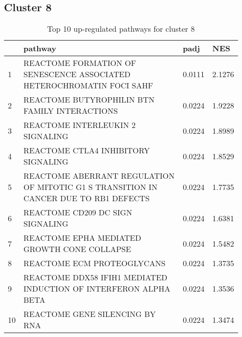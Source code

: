 \documentclass{article}
\begin{document}
\subsection{Cluster 8 }
\begin{table}[H]
\centering
\begin{tabular}{p{0.05\linewidth}p{0.7\linewidth}p{0.1\linewidth}p{0.1\linewidth}}
  \hline
 & pathway & padj & NES \\ 
  \hline
1 & REACTOME FORMATION OF SENESCENCE ASSOCIATED HETEROCHROMATIN FOCI SAHF & 0.0111 & 2.1276 \\ 
  2 & REACTOME BUTYROPHILIN BTN FAMILY INTERACTIONS & 0.0224 & 1.9228 \\ 
  3 & REACTOME INTERLEUKIN 2 SIGNALING & 0.0224 & 1.8989 \\ 
  4 & REACTOME CTLA4 INHIBITORY SIGNALING & 0.0224 & 1.8529 \\ 
  5 & REACTOME ABERRANT REGULATION OF MITOTIC G1 S TRANSITION IN CANCER DUE TO RB1 DEFECTS & 0.0224 & 1.7735 \\ 
  6 & REACTOME CD209 DC SIGN SIGNALING & 0.0224 & 1.6381 \\ 
  7 & REACTOME EPHA MEDIATED GROWTH CONE COLLAPSE & 0.0224 & 1.5482 \\ 
  8 & REACTOME ECM PROTEOGLYCANS & 0.0224 & 1.3735 \\ 
  9 & REACTOME DDX58 IFIH1 MEDIATED INDUCTION OF INTERFERON ALPHA BETA & 0.0224 & 1.3536 \\ 
  10 & REACTOME GENE SILENCING BY RNA & 0.0224 & 1.3474 \\ 
   \hline
\end{tabular}
\caption{Top 10 up-regulated pathways for cluster 8} 
\label{tab:q3_2_8}
\end{table}
\end{document}

